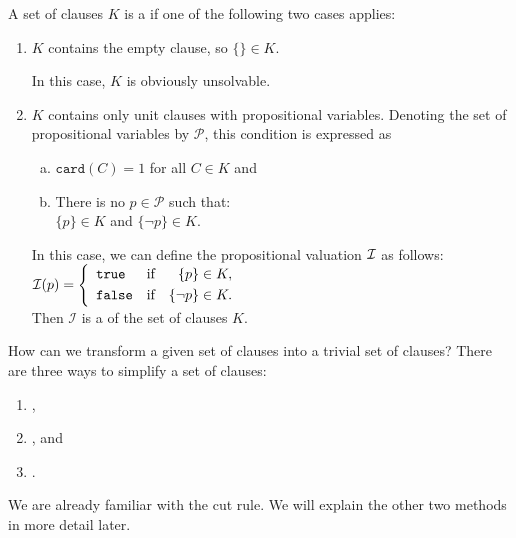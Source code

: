 \begin{Definition}
  A set of clauses $K$ is a  if one of the following two cases applies:
  \begin{enumerate}
  \item $K$ contains the empty clause, so $\{\} \in K$.

        In this case, $K$ is obviously unsolvable.
  \item $K$ contains only unit clauses with \underline{} propositional variables.
        Denoting the set of propositional variables by $\mathcal{P}$,
        this condition is expressed as 
        \begin{enumerate}[(a)]
        \item $\texttt{card}(C) = 1$ \quad for all $C \in K$ \quad and
        \item There is no $p \in \mathcal{P}$ such that: 
              \\[0.2cm]
              \hspace*{1.3cm}
              $\{p\} \in K$ \quad and \quad $\{\neg p\} \in K$.
        \end{enumerate}
        In this case, we can define the propositional valuation $\mathcal{I}$ as follows:
        \\[0.2cm]
        \hspace*{1.3cm}
        $\mathcal{I}(p) = \left\{
                   \begin{array}{lcr}
                     \texttt{true}  & \mbox{if} & \{p\}      \in K, \\[0.1cm]
                     \texttt{false} & \mbox{if} & \{\neg p\} \in K.
                   \end{array}
                 \right.
        $
        \\[0.2cm]
        Then $\mathcal{I}$ is a  of the set of clauses $K$. \eox
  \end{enumerate}
\end{Definition}

How can we transform a given set of clauses into a trivial set of clauses?
There are three ways to simplify a set of clauses:
\begin{enumerate}
\item {},
\item {}, and
\item {}.
\end{enumerate}
We are already familiar with the cut rule.  We will explain the other two methods in more detail later.

